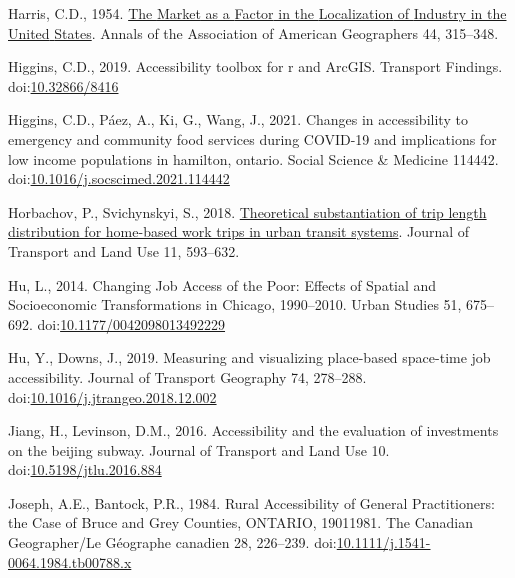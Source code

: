 \documentclass[]{elsarticle} %
\newlength{\cslhangindent}
\newlength{\cslentryspacingunit} %
\newenvironment{CSLReferences}[2] %
 {%
  \setlength{\parindent}{0pt}
  \ifodd #1
  \let\oldpar\par
  \def\par{\hangindent=\cslhangindent\oldpar}
  \fi
  \setlength{\parskip}{#2\cslentryspacingunit}
 }%
 {}
\begin{document}
\begin{CSLReferences}{1}{0}
\leavevmode{}%
Harris, C.D., 1954. \href{https://www.jstor.org/stable/2561395}{The
{Market} as a {Factor} in the {Localization} of {Industry} in the
{United} {States}}. Annals of the Association of American Geographers
44, 315--348.

\leavevmode{}%
Higgins, C.D., 2019. Accessibility toolbox for r and ArcGIS. Transport
Findings. doi:\href{https://doi.org/10.32866/8416}{10.32866/8416}

\leavevmode{}%
Higgins, C.D., Páez, A., Ki, G., Wang, J., 2021. Changes in
accessibility to emergency and community food services during COVID-19
and implications for low income populations in hamilton, ontario. Social
Science \& Medicine 114442.
doi:\href{https://doi.org/10.1016/j.socscimed.2021.114442}{10.1016/j.socscimed.2021.114442}

\leavevmode{}%
Horbachov, P., Svichynskyi, S., 2018.
\href{https://www.jstor.org/stable/26622420}{Theoretical substantiation
of trip length distribution for home-based work trips in urban transit
systems}. Journal of Transport and Land Use 11, 593--632.

\leavevmode{}%
Hu, L., 2014. Changing {Job} {Access} of the {Poor}: {Effects} of
{Spatial} and {Socioeconomic} {Transformations} in {Chicago},
1990--2010. Urban Studies 51, 675--692.
doi:\href{https://doi.org/10.1177/0042098013492229}{10.1177/0042098013492229}

\leavevmode{}%
Hu, Y., Downs, J., 2019. Measuring and visualizing place-based
space-time job accessibility. Journal of Transport Geography 74,
278--288.
doi:\href{https://doi.org/10.1016/j.jtrangeo.2018.12.002}{10.1016/j.jtrangeo.2018.12.002}

\leavevmode{}%
Jiang, H., Levinson, D.M., 2016. Accessibility and the evaluation of
investments on the beijing subway. Journal of Transport and Land Use 10.
doi:\href{https://doi.org/10.5198/jtlu.2016.884}{10.5198/jtlu.2016.884}

\leavevmode{}%
Joseph, A.E., Bantock, P.R., 1984. Rural Accessibility of General
Practitioners: the Case of Bruce and Grey Counties, ONTARIO,
1901{\textendash}1981. The Canadian Geographer/Le Géographe canadien 28,
226--239.
doi:\href{https://doi.org/10.1111/j.1541-0064.1984.tb00788.x}{10.1111/j.1541-0064.1984.tb00788.x}


\end{CSLReferences}
\end{document}
